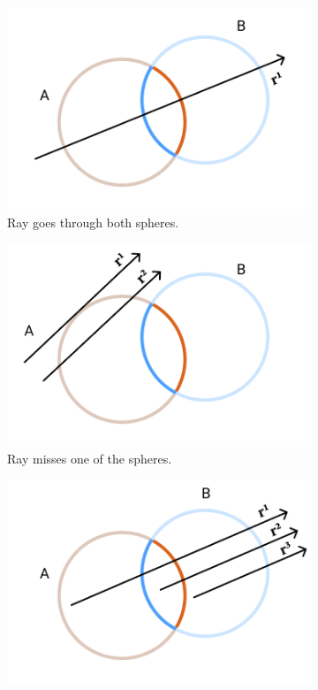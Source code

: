 \documentclass[a4paper,11pt,oneside]{article}
\begin{document}
\begin{figure}[ht]
	\centering
	\begin{subfigure}[b]{0.3\textwidth}
		\centering
		\includegraphics[width=\textwidth]{section3/3.4/intersection-case-1.png}
		\caption{Ray goes through both spheres.}
		\label{sec3.4:intersection-case-1}
	\end{subfigure}
	\hfill
	\begin{subfigure}[b]{0.3\textwidth}
		\centering
		\includegraphics[width=\textwidth]{section3/3.4/intersection-case-2.png}
		\caption{Ray misses one of the spheres.}
		\label{sec3.4:intersection-case-2}
	\end{subfigure}
	\hfill
	\begin{subfigure}[b]{0.3\textwidth}
		\centering
		\includegraphics[width=\textwidth]{section3/3.4/intersection-case-3.png}

\end{subfigure}
\end{figure}
\end{document}
